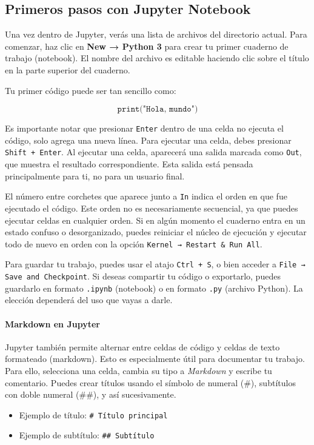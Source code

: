 \documentclass{article}
\theoremstyle{nonumberplain}
\begin{document}
\subsection*{Primeros pasos con Jupyter Notebook}

Una vez dentro de Jupyter, verás una lista de archivos del directorio actual. Para comenzar, haz clic en \textbf{New → Python 3} para crear tu primer cuaderno de trabajo (notebook). El nombre del archivo es editable haciendo clic sobre el título en la parte superior del cuaderno.

Tu primer código puede ser tan sencillo como:

\[
\texttt{print("Hola, mundo")}
\]

Es importante notar que presionar \texttt{Enter} dentro de una celda no ejecuta el código, solo agrega una nueva línea. Para ejecutar una celda, debes presionar \texttt{Shift + Enter}. Al ejecutar una celda, aparecerá una salida marcada como \texttt{Out}, que muestra el resultado correspondiente. Esta salida está pensada principalmente para ti, no para un usuario final.

El número entre corchetes que aparece junto a \texttt{In} indica el orden en que fue ejecutado el código. Este orden no es necesariamente secuencial, ya que puedes ejecutar celdas en cualquier orden. Si en algún momento el cuaderno entra en un estado confuso o desorganizado, puedes reiniciar el núcleo de ejecución y ejecutar todo de nuevo en orden con la opción \texttt{Kernel → Restart \& Run All}.

Para guardar tu trabajo, puedes usar el atajo \texttt{Ctrl + S}, o bien acceder a \texttt{File → Save and Checkpoint}. Si deseas compartir tu código o exportarlo, puedes guardarlo en formato \texttt{.ipynb} (notebook) o en formato \texttt{.py} (archivo Python). La elección dependerá del uso que vayas a darle.

\paragraph{Markdown en Jupyter}

Jupyter también permite alternar entre celdas de código y celdas de texto formateado (markdown). Esto es especialmente útil para documentar tu trabajo. Para ello, selecciona una celda, cambia su tipo a \textit{Markdown} y escribe tu comentario. Puedes crear títulos usando el símbolo de numeral (\#), subtítulos con doble numeral (\#\#), y así sucesivamente.

\begin{itemize}
    \item Ejemplo de título: \texttt{\# Título principal}
    \item Ejemplo de subtítulo: \texttt{\#\# Subtítulo}
\end{itemize}
\end{document}
